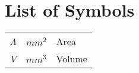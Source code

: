 \clearpage
\chapter*{List of Symbols}


\begin{tabular}{lll}
     \textit{A} & $mm^2$ & Area\\
     \textit{V} & $mm^3$ & Volume
\end{tabular}
